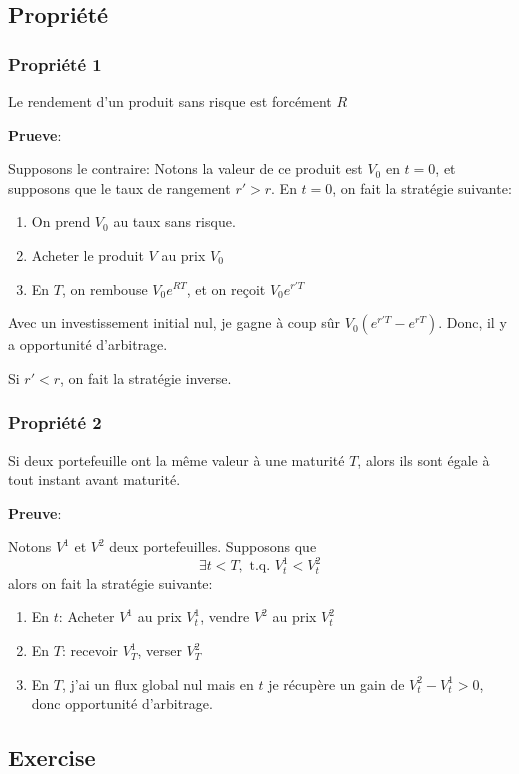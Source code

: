 \documentclass{article}
\theoremstyle{plain}
\theoremstyle{definition}
\begin{document}
\subsection{Propri\'et\'e}
\subsubsection{Propri\'et\'e 1}

Le rendement d'un produit sans risque est forc\'ement $R$

\textbf{Prueve}:

Supposons le contraire: Notons la valeur de ce produit est $V_0$ en $t=0$, et supposons que le taux de rangement $r'>r$. En $t=0$, on fait la strat\'egie suivante:
\begin{enumerate}
	\item On prend $V_0$ au taux sans risque.
	\item Acheter le produit $V$ au prix $V_0$
	\item En $T$, on rembouse $V_0e^{RT}$, et on re\c{c}oit $V_0e^{r'T}$
\end{enumerate}
Avec un investissement initial nul, je gagne \`a coup s\^ur $V_0(e^{r'T}-e^{rT})$. Donc, il y a opportunit\'e d'arbitrage.

Si $r'<r$, on fait la strat\'egie inverse.

\subsubsection{Propri\'et\'e 2}
Si deux portefeuille ont la m\^eme valeur \`a une maturit\'e $T$, alors ils sont \'egale \`a tout instant avant maturit\'e.

\textbf{Preuve}:

Notons $V^1$ et $V^2$ deux portefeuilles. Supposons que 
\begin{equation}
	\exists t<T, \text{ t.q. } V_t^1<V_t^2
\end{equation}
alors on fait la strat\'egie suivante:
\begin{enumerate}
	\item En $t$: Acheter $V^1$ au prix $V_t^1$, vendre $V^2$ au prix $V_t^2$
	\item En $T$: recevoir $V_T^1$, verser $V_T^2$
	\item En $T$, j'ai un flux global nul mais en $t$ je r\'ecup\`ere un gain de $V_t^2-V_t^1>0$, donc opportunit\'e d'arbitrage.
\end{enumerate}

\subsection{Exercise}
\end{document}

